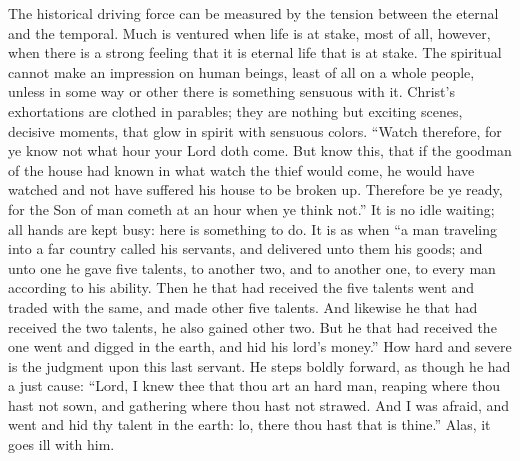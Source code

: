\documentclass[12pt,a4paper,openany]{book}
\newcommand{\opage}[1]{\marginnote{\footnotesize\textit{[#1]}}}
\begin{document}
The historical driving force can be measured by the tension
between the eternal and the temporal. Much is ventured
when life is at stake, most of all, however, when there
is a strong feeling that it is eternal life that is at stake.
The spiritual cannot make an impression on human beings,
least of all on a whole people, unless in some
way or other there is something sensuous with it. Christ's
exhortations are clothed in parables; they are nothing but
exciting scenes, decisive moments, that glow in
spirit with sensuous colors. ``Watch therefore, for ye
know not what hour your Lord doth come. But
know this, that if the goodman of the house had known in
what watch the thief would come, he would have watched
and not have suffered his house to be broken up. Therefore be ye ready,
for the Son of man cometh at an hour when ye
think not.'' It is no idle waiting; all hands
are kept busy: here is something to do. It is as
when ``a man traveling into a far country called his servants,
and delivered unto them his goods; and unto one he gave five
talents, to another two, and to another one, to every man according to
his ability. Then he that had received the five
talents went and traded with the same, and made other
five talents. And likewise he that had received
the two talents, he also gained other two. But he
that had received the one went and digged in
the earth, and hid his lord's money.'' How hard and
severe is the judgment upon this last servant. He
\setcounter{footnote}{0}%
\opage{45}steps boldly forward, as though he had a just
cause: ``Lord, I knew thee that thou art an hard man,
reaping where thou hast not sown, and gathering where
thou hast not strawed. And I was afraid, and went
and hid thy talent in the earth: lo, there thou hast that
is thine.'' Alas, it goes ill with him.
\end{document}
